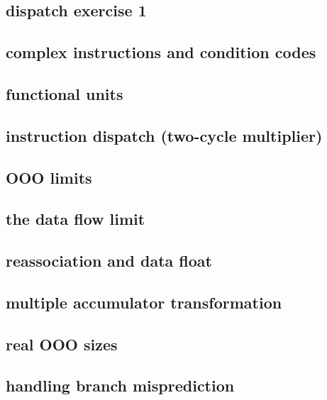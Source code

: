 \subsection{dispatch exercise 1}


\subsection{complex instructions and condition codes}


\subsection{functional units}


\subsection{instruction dispatch (two-cycle multiplier)}



\subsection{OOO limits}


\subsection{the data flow limit}





\subsection{reassociation and data float}


\subsection{multiple accumulator transformation}


\subsection{real OOO sizes}


\subsection{handling branch misprediction}


